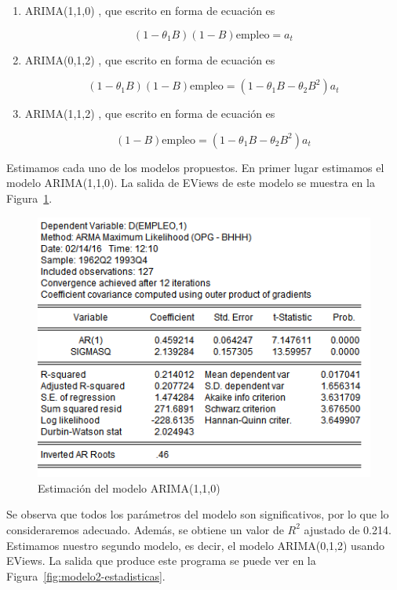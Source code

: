 \documentclass[12pt,a4paper,twoside,openright,titlepage,final]{article}
\begin{document}
\begin{enumerate}
	\item ARIMA(1,1,0) \label{mod:1}, que escrito en forma de ecuación es
	
	\[ (1-\theta_1 B) (1-B) \text{empleo} = a_t \] 
	\item ARIMA(0,1,2) \label{mod:2}, que escrito en forma de ecuación es
	
	\[ (1-\theta_1 B) (1-B) \text{empleo} = (1-\theta_1 B - \theta_2 B^2)a_t \] 
	\item ARIMA(1,1,2) \label{mod:3}, que escrito en forma de ecuación es
	
	\[ (1-B) \text{empleo} = (1-\theta_1 B - \theta_2 B^2) a_t \] 
\end{enumerate}

Estimamos cada uno de los modelos propuestos. En primer lugar estimamos el modelo ARIMA(1,1,0). La salida de EViews de este modelo se muestra en la Figura~\ref{fig:modelo1-estadisticas}.\\


\begin{figure}[tbph!]
	\centering
	\includegraphics[width=0.7\linewidth]{imagenes/empleo/modelo1-estadisticas.png}
	\caption{Estimación del modelo ARIMA(1,1,0)}
	\label{fig:modelo1-estadisticas}
\end{figure}

Se observa que todos los parámetros del modelo son significativos, por lo que lo consideraremos adecuado. Además, se obtiene un valor de $R^2$ ajustado de 0.214.\\

Estimamos nuestro segundo modelo, es decir, el modelo ARIMA(0,1,2) usando EViews. La salida que produce este programa se puede ver en la Figura~\ref{fig:modelo2-estadisticas}.\\
\end{document}
